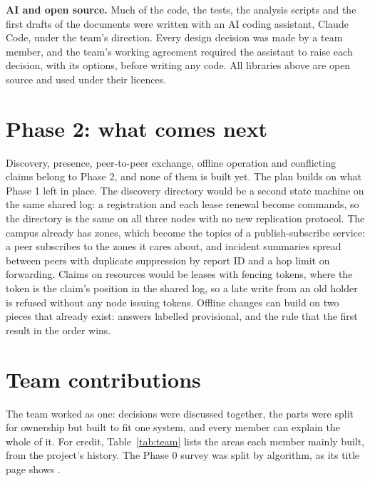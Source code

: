 \textbf{AI and open source.} Much of the code, the tests, the analysis scripts and the first drafts of the documents were written with an AI coding assistant, Claude Code, under the team's direction. Every design decision was made by a team member, and the team's working agreement required the assistant to raise each decision, with its options, before writing any code. All libraries above are open source and used under their licences.

\section{Phase 2: what comes next}
\label{sec:phase2}

Discovery, presence, peer-to-peer exchange, offline operation and conflicting claims belong to Phase 2, and none of them is built yet. The plan builds on what Phase 1 left in place. The discovery directory would be a second state machine on the same shared log: a registration and each lease renewal become commands, so the directory is the same on all three nodes with no new replication protocol. The campus already has zones, which become the topics of a publish-subscribe service: a peer subscribes to the zones it cares about, and incident summaries spread between peers with duplicate suppression by report ID and a hop limit on forwarding. Claims on resources would be leases with fencing tokens, where the token is the claim's position in the shared log, so a late write from an old holder is refused without any node issuing tokens. Offline changes can build on two pieces that already exist: answers labelled provisional, and the rule that the first result in the order wins.

\section{Team contributions}
\label{sec:team}

The team worked as one: decisions were discussed together, the parts were split for ownership but built to fit one system, and every member can explain the whole of it. For credit, Table~\ref{tab:team} lists the areas each member mainly built, from the project's history. The Phase 0 survey was split by algorithm, as its title page shows \cite{survey}.

